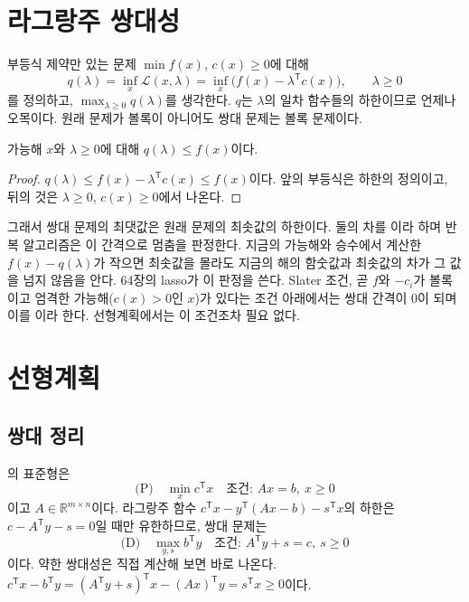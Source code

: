 \section{라그랑주 쌍대성}
\label{sec:lagrange-duality}

부등식 제약만 있는 문제 $\min f(x)$, $c(x)\ge0$에 대해 
\[
q(\lambda)=\inf_x\mathcal L(x,\lambda)=\inf_x\bigl(f(x)-\lambda^{\mathsf T}c(x)\bigr),\qquad\lambda\ge0
\]
를 정의하고,  $\max_{\lambda\ge0}q(\lambda)$를 생각한다. $q$는 $\lambda$의 일차 함수들의 하한이므로 언제나 오목이다. 원래 문제가 볼록이 아니어도 쌍대 문제는 볼록 문제이다.

\begin{proposition}[약한 쌍대성]
가능해 $x$와 $\lambda\ge0$에 대해 $q(\lambda)\le f(x)$이다.
\end{proposition}

\begin{proof}
$q(\lambda)\le f(x)-\lambda^{\mathsf T}c(x)\le f(x)$이다. 앞의 부등식은 하한의 정의이고, 뒤의 것은 $\lambda\ge0$, $c(x)\ge0$에서 나온다.
\end{proof}

그래서 쌍대 문제의 최댓값은 원래 문제의 최솟값의 하한이다. 둘의 차를 이라 하며 반복 알고리즘은 이 간격으로 멈춤을 판정한다. 지금의 가능해와 승수에서 계산한 $f(x)-q(\lambda)$가 작으면 최솟값을 몰라도 지금의 해의 함숫값과 최솟값의 차가 그 값을 넘지 않음을 안다. 64장의 lasso가 이 판정을 쓴다. Slater 조건, 곧 $f$와 $-c_i$가 볼록이고 엄격한 가능해($c(x)>0$인 $x$)가 있다는 조건 아래에서는 쌍대 간격이 $0$이 되며 이를 이라 한다\cite{boyd2004convex}. 선형계획에서는 이 조건조차 필요 없다.

\section{선형계획}
\label{sec:linear-programming}

\subsection{쌍대 정리}

의 표준형은
\[
\text{(P)}\quad\min_xc^{\mathsf T}x\quad\text{조건: }Ax=b,\ x\ge0
\]
이고 $A\in\mathbb R^{m\times n}$이다. 라그랑주 함수 $c^{\mathsf T}x-y^{\mathsf T}(Ax-b)-s^{\mathsf T}x$의 하한은 $c-A^{\mathsf T}y-s=0$일 때만 유한하므로, 쌍대 문제는
\[
\text{(D)}\quad\max_{y,s}b^{\mathsf T}y\quad\text{조건: }A^{\mathsf T}y+s=c,\ s\ge0
\]
이다. 약한 쌍대성은 직접 계산해 보면 바로 나온다. $c^{\mathsf T}x-b^{\mathsf T}y=(A^{\mathsf T}y+s)^{\mathsf T}x-(Ax)^{\mathsf T}y=s^{\mathsf T}x\ge0$이다.

